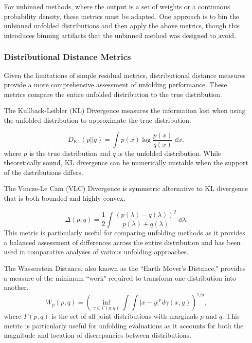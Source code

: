 For unbinned methods, where the output is a set of weights or a continuous probability density, these metrics must be adapted.
%
One approach is to bin the unbinned unfolded distributions and then apply the above metrics, though this introduces binning artifacts that the unbinned method was designed to avoid.

\subsubsection{Distributional Distance Metrics}
Given the limitations of simple residual metrics, distributional distance measures provide a more comprehensive assessment of unfolding performance.
%
These metrics compare the entire unfolded distribution to the true distribution.

The Kullback-Leibler (KL) Divergence measures the information lost when using the unfolded distribution to approximate the true distribution.

\begin{equation}
D_{\text{KL}}(p||q) = \int p(x) \log \frac{p(x)}{q(x)} \;\dd x,
\end{equation}
where \(p\) is the true distribution and
\(q\) is the unfolded distribution.
%
While theoretically sound, KL divergence can be numerically unstable when the support of the distributions differs.


The Vincze-Le Cam (VLC) Divergence is symmetric alternative to KL divergence that is both bounded and highly convex.

\begin{equation}
\Delta(p, q) = \frac{1}{2}\int \frac{(p(\lambda) - q(\lambda))^2}{p(\lambda) + q(\lambda)} \;\dd\lambda.
\end{equation}
This metric is particularly useful for comparing unfolding methods as it provides a balanced assessment of differences across the entire distribution and has been used in comparative analyses of various unfolding approaches.

The Wasserstein Distance, also known as the ``Earth Mover's Distance," provides a measure of the minimum ``work" required to transform one distribution into another.
\begin{equation}
W_p(p, q) = \left(\inf_{\gamma \in \Gamma(p, q)} \int\int |x-y|^p d\gamma(x, y)\right)^{1/p},
\end{equation}
where \(\Gamma(p, q)\) is the set of all joint distributions with marginals \(p\) and \(q\).
%
This metric is particularly useful for unfolding evaluations as it accounts for both the magnitude and location of discrepancies between distributions.

